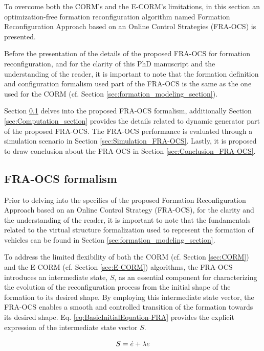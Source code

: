 To overcome both the CORM's and the E-CORM's limitations, in this section an optimization-free formation reconfiguration algorithm named Formation Reconfiguration Approach based on an Online Control Strategies (FRA-OCS) is presented. 


Before the presentation of the details of the proposed FRA-OCS for formation reconfiguration, and for the clarity of this PhD manuscript and the understanding of the reader, it is important to note that the formation definition and configuration formalism used part of the FRA-OCS is the same as the one used for the CORM (cf. Section \ref{sec:formation_modeling_section}). 


Section \ref{sec:FRA-OCS} delves into the proposed FRA-OCS formalism, additionally Section \ref{sec:Computation_section} provides the details related to dynamic generator part of the proposed FRA-OCS. The FRA-OCS performance is evaluated through a simulation scenario in Section \ref{sec:Simulation_FRA-OCS}. Lastly, it is proposed to draw conclusion about the FRA-OCS in Section \ref{sec:Conclusion_FRA-OCS}.  


\subsection{FRA-OCS formalism} \label{sec:FRA-OCS}
Prior to delving into the specifics of the proposed Formation Reconfiguration Approach based on an Online Control Strategy (FRA-OCS), for the clarity and the understanding of the reader, it is important to note that the fundamentals related to the virtual structure formalization used to represent the formation of vehicles can be found in Section \ref{sec:formation_modeling_section}. 


To address the limited flexibility of both the CORM (cf. Section \ref{sec:CORM}) and the E-CORM (cf. Section \ref{sec:E-CORM}) algorithms, the FRA-OCS introduces an intermediate state, $S$, as an essential component for characterizing the evolution of the reconfiguration process from the initial shape of the formation to its desired shape. By employing this intermediate state vector, the FRA-OCS enables a smooth and controlled transition of the formation towards its desired shape. Eq. \ref{eq:BasicInitialEquation-FRA} provides the explicit expression of the intermediate state vector $S$.  

\begin{equation} \label{eq:BasicInitialEquation-FRA}
    S = \dot{e} + \lambda e \\
\end{equation}

